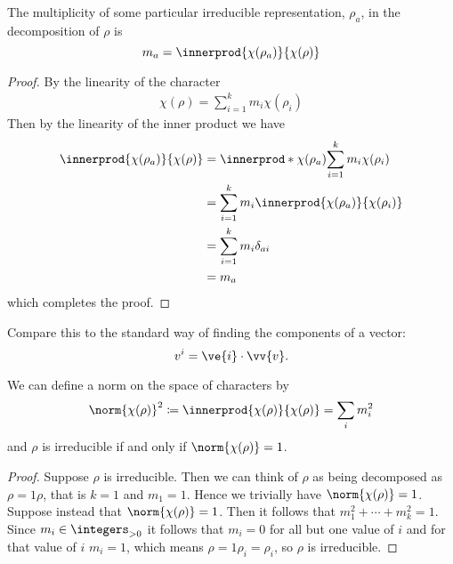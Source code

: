 \documentclass[fleqn]{NotesClass}
\newcommand*{\positiveintegers}{\integers_{>0}}
\begin{document}
    \begin{crl}{}{}
        The multiplicity of some particular irreducible representation, \(\rho_a\), in the decomposition of \(\rho\) is
        \begin{equation}
            m_a = \innerprod{\chi(\rho_a)}{\chi(\rho)}
        \end{equation}
        \begin{proof}
            By the linearity of the character
            \begin{align}
                \chi(\rho) = \sum_{i = 1}^{k} m_i\chi(\rho_i)
            \end{align}
            Then by the linearity of the inner product we have
            \begin{align}
                \innerprod{\chi(\rho_a)}{\chi(\rho)} &= \innerprod*{\chi(\rho_a)}{\sum_{i=1}^{k}m_i\chi(\rho_i)}\\
                &= \sum_{i = 1}^{k} m_i \innerprod{\chi(\rho_a)}{\chi(\rho_i)}\\
                &= \sum_{i = 1}^{k} m_i \delta_{ai}\\
                &= m_a
            \end{align}
            which completes the proof.
        \end{proof}
    \end{crl}
    
    Compare this to the standard way of finding the components of a vector:
    \begin{equation}
        v^i = \ve{i} \cdot \vv{v}.
    \end{equation}
    
    \begin{crl}{}{}
        We can define a norm on the space of characters by
        \begin{equation}
            \norm{\chi(\rho)}^{2} \coloneqq \innerprod{\chi(\rho)}{\chi(\rho)} = \sum_{i} m_i^2
        \end{equation}
        and \(\rho\) is irreducible if and only if \(\norm{\chi(\rho)} = 1\).
        \begin{proof}
            Suppose \(\rho\) is irreducible.
            Then we can think of \(\rho\) as being decomposed as \(\rho = 1\rho\), that is \(k = 1\) and \(m_1 = 1\).
            Hence we trivially have \(\norm{\chi(\rho)} = 1\).
            Suppose instead that \(\norm{\chi(\rho)} = 1\).
            Then it follows that \(m_1^2 + \dotsb + m_k^2 = 1\).
            Since \(m_i \in \positiveintegers\) it follows that \(m_i = 0\) for all but one value of \(i\) and for that value of \(i\) \(m_i = 1\), which means \(\rho = 1\rho_i = \rho_i\), so \(\rho\) is irreducible.
        \end{proof}
    \end{crl}
    
\end{document}
